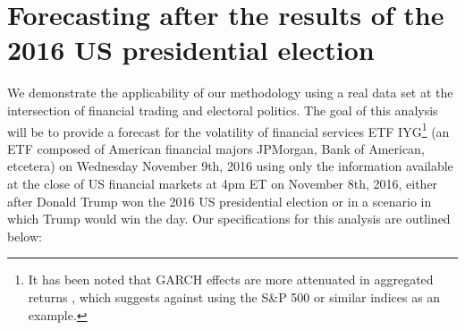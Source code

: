 \documentclass[11pt,3p,review,authoryear]{elsarticle}
\theoremstyle{definition}
\begin{document}
\clearpage 

\section{Forecasting after the results of the 2016 US presidential election}\label{Real Data Example}

We demonstrate the applicability of our methodology using a real data set at the intersection of financial trading and electoral politics. The goal of this analysis will be to provide a forecast for the volatility of financial services ETF IYG\footnote{It has been noted that GARCH effects are more attenuated in aggregated returns \citep{zivot2009practical}, which suggests against using the S\&P 500 or similar indices as an example.} (an ETF composed of American financial majors JPMorgan, Bank of American, etcetera) on Wednesday November 9th, 2016 using only the information available at the close of US financial markets at 4pm ET on November 8th, 2016, either after Donald Trump won the 2016 US presidential election or in a scenario in which Trump would win the day. Our specifications for this analysis are outlined below:


\end{document}
